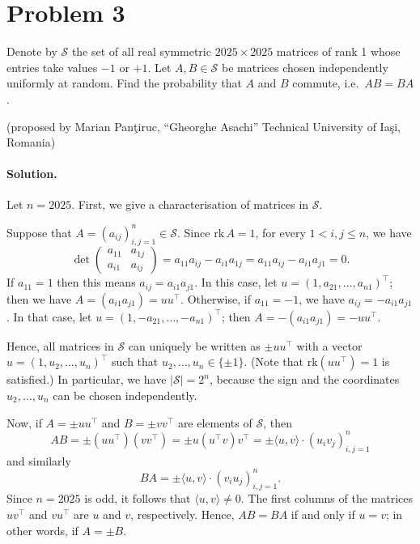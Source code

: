 \documentclass{article}
\begin{document}
\section*{Problem 3}
Denote by $\mathcal{S}$ the set of all real symmetric $2025 \times 2025$ matrices of rank 1 whose entries take values $-1$ or $+1$. Let $A, B \in \mathcal{S}$ be matrices chosen independently uniformly at random. Find the probability that $A$ and $B$ commute, i.e.\ $AB = BA$.

(proposed by Marian Panţiruc, ``Gheorghe Asachi'' Technical University of Iaşi, Romania)

\paragraph{Solution.}
Let $n = 2025$. First, we give a characterisation of matrices in $\mathcal{S}$.

Suppose that $A = (a_{ij})_{i,j=1}^n \in \mathcal{S}$. Since $\mathrm{rk}\, A = 1$, for every $1 < i,j \leq n$, we have
\[
\det\begin{pmatrix} a_{11} & a_{1j} \\ a_{i1} & a_{ij} \end{pmatrix} = a_{11}a_{ij} - a_{i1}a_{1j} = a_{11}a_{ij} - a_{i1}a_{j1} = 0.
\]
If $a_{11} = 1$ then this means $a_{ij} = a_{i1} a_{j1}$. In this case, let $u = (1, a_{21}, \ldots, a_{n1})^{\top}$; then we have $A = (a_{i1}a_{j1}) = u u^{\top}$. Otherwise, if $a_{11} = -1$, we have $a_{ij} = -a_{i1}a_{j1}$. In that case, let $u = (1, -a_{21}, \ldots, -a_{n1})^{\top}$; then $A = -(a_{i1} a_{j1}) = -u u^{\top}$.

Hence, all matrices in $\mathcal{S}$ can uniquely be written as $\pm u u^{\top}$ with a vector $u = (1, u_2, \ldots, u_n)^{\top}$ such that $u_2, \ldots, u_n \in \{\pm 1\}$. (Note that $\mathrm{rk}(u u^{\top}) = 1$ is satisfied.) In particular, we have $|\mathcal{S}| = 2^n$, because the sign and the coordinates $u_2, \ldots, u_n$ can be chosen independently.

Now, if $A = \pm u u^{\top}$ and $B = \pm v v^{\top}$ are elements of $\mathcal{S}$, then
\[
AB = \pm (u u^{\top})(v v^{\top}) = \pm u(u^{\top} v) v^{\top} = \pm \langle u, v \rangle \cdot (u_i v_j)_{i,j=1}^n
\]
and similarly
\[
BA = \pm \langle u, v \rangle \cdot (v_i u_j)_{i,j=1}^n.
\]
Since $n = 2025$ is odd, it follows that $\langle u, v \rangle \neq 0$. The first columns of the matrices $u v^{\top}$ and $v u^{\top}$ are $u$ and $v$, respectively. Hence, $AB = BA$ if and only if $u = v$; in other words, if $A = \pm B$.
\end{document}
